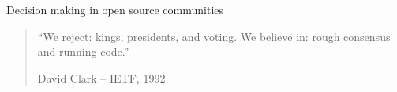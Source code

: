 \documentclass[12pt]{beamer}
\begin{document}

\begin{frame}[fragile]{Decision making in open source communities}

\large
\begin{quote}
    ``We reject: kings, presidents, and voting. We believe in:
rough consensus and running code.'' 
\begin{flushright}
    David Clark -- IETF, 1992
\end{flushright}
\end{quote}


\end{frame}

 

\end{document}
